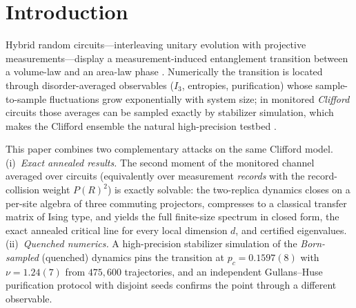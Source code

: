 \documentclass[11pt]{article}
\begin{document}
\section{Introduction}\label{sec:intro}

Hybrid random circuits---interleaving unitary evolution with projective
measurements---display a measurement-induced entanglement transition between
a volume-law and an area-law phase
\citep{Skinner2019,Li2018,Gullans2020,Nahum2020}.  Numerically the transition
is located through disorder-averaged observables ($I_3$, entropies,
purification) whose sample-to-sample fluctuations grow exponentially with
system size; in monitored \emph{Clifford} circuits those averages can be
sampled exactly by stabilizer simulation, which makes the Clifford ensemble
the natural high-precision testbed \citep{Gullans2020,Sierant2022,Zabalo2020}.

This paper combines two complementary attacks on the same Clifford model.
(i)~\emph{Exact annealed results.}  The second moment of the monitored
channel averaged over circuits (equivalently over measurement \emph{records}
with the record-collision weight $P(R)^2$) is exactly solvable: the
two-replica dynamics closes on a per-site algebra of three commuting
projectors, compresses to a classical transfer matrix of Ising type, and
yields the full finite-size spectrum in closed form, the exact annealed
critical line for every local dimension $d$, and certified eigenvalues.
(ii)~\emph{Quenched numerics.}  A high-precision stabilizer simulation of the
\emph{Born-sampled} (quenched) dynamics pins the transition at
$p_c=0.1597(8)$ with $\nu=1.24(7)$ from $475{,}600$ trajectories, and an
independent Gullans--Huse purification protocol with disjoint seeds confirms
the point through a different observable.
\end{document}
